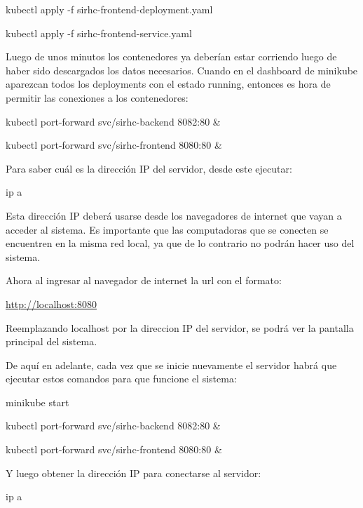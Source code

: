 \documentclass{article}
\begin{document}
kubectl apply -f sirhc-frontend-deployment.yaml

kubectl apply -f sirhc-frontend-service.yaml

Luego de unos minutos los contenedores ya deberían estar corriendo luego de haber sido descargados los datos necesarios. Cuando en el dashboard de minikube aparezcan todos los deployments con el estado running, entonces es hora de permitir las conexiones a los contenedores:

kubectl port-forward svc/sirhc-backend 8082:80 \&

kubectl port-forward svc/sirhc-frontend 8080:80 \&

Para saber cuál es la dirección IP del servidor, desde este ejecutar:

ip a

Esta dirección IP deberá usarse desde los navegadores de internet que vayan a acceder al sistema. Es importante que las computadoras que se conecten se encuentren en la misma red local, ya que de lo contrario no podrán hacer uso del sistema.

Ahora al ingresar al navegador de internet la url con el formato:

\href{http://localhost:8080}{http://localhost:8080}

Reemplazando localhost por la direccion IP del servidor, se podrá ver la pantalla principal del sistema.

De aquí en adelante, cada vez que se inicie nuevamente el servidor habrá que ejecutar estos comandos para que funcione el sistema:

minikube start

kubectl port-forward svc/sirhc-backend 8082:80 \&

kubectl port-forward svc/sirhc-frontend 8080:80 \&

Y luego obtener la dirección IP para conectarse al servidor:

ip a
\end{document}
